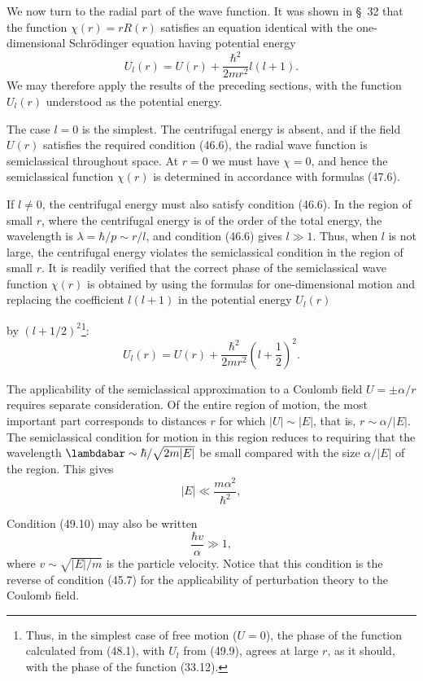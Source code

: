 We now turn to the radial part of the wave function. It was shown in §~32 that
the function $\chi(r)=rR(r)$ satisfies an equation identical with the
one-dimensional Schrödinger equation having potential energy
\[
  U_l(r)=U(r)+\frac{\hbar^2}{2mr^2}l(l+1).
\]
We may therefore apply the results of the preceding sections, with the
function $U_l(r)$ understood as the potential energy.

The case $l=0$ is the simplest. The centrifugal energy is absent, and if the
field $U(r)$ satisfies the required condition (46.6), the radial wave function
is semiclassical throughout space. At $r=0$ we must have $\chi=0$, and hence
the semiclassical function $\chi(r)$ is determined in accordance with formulas
(47.6).

If $l\ne0$, the centrifugal energy must also satisfy condition (46.6). In the
region of small $r$, where the centrifugal energy is of the order of the total
energy, the wavelength is $\lambda=\hbar/p\sim r/l$, and condition (46.6)
gives $l\gg1$. Thus, when $l$ is not large, the centrifugal energy violates
the semiclassical condition in the region of small $r$. It is readily verified
that the correct phase of the semiclassical wave function $\chi(r)$ is
obtained by using the formulas for one-dimensional motion and replacing the
coefficient $l(l+1)$ in the potential energy $U_l(r)$

by $(l+1/2)^2$\footnote{Thus, in the simplest case of free motion ($U=0$), the
phase of the function calculated from (48.1), with $U_l$ from (49.9), agrees
at large $r$, as it should, with the phase of the function (33.12).}:
\begin{equation}
  U_l(r)=U(r)+\frac{\hbar^2}{2mr^2}\left(l+\frac12\right)^2.
  \tag{49.9}
\end{equation}

The applicability of the semiclassical approximation to a Coulomb field
$U=\pm\alpha/r$ requires separate consideration. Of the entire region of
motion, the most important part corresponds to distances $r$ for which
$|U|\sim|E|$, that is, $r\sim\alpha/|E|$. The semiclassical condition for
motion in this region reduces to requiring that the wavelength
$\lambdabar\sim\hbar/\sqrt{2m|E|}$ be small compared with the size
$\alpha/|E|$ of the region. This gives
\begin{equation}
  |E|\ll\frac{m\alpha^2}{\hbar^2},
  \tag{49.10}
\end{equation}

Condition (49.10) may also be
written
\begin{equation}
  \frac{\hbar v}{\alpha}\gg1,
  \tag{49.11}
\end{equation}
where $v\sim\sqrt{|E|/m}$ is the particle velocity. Notice that this condition
is the reverse of condition (45.7) for the applicability of perturbation
theory to the Coulomb field.

